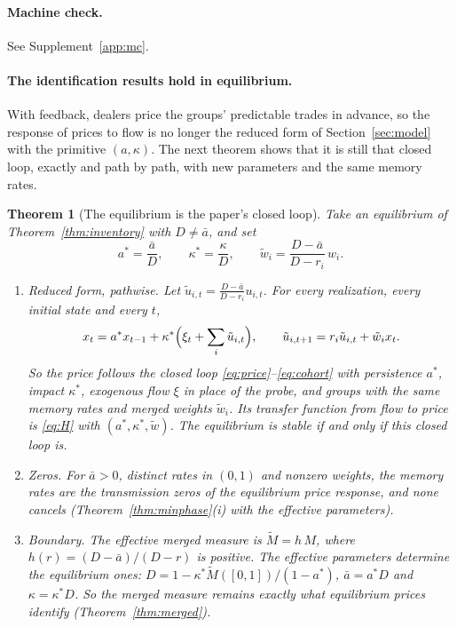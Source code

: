 \documentclass[12pt]{article}
\newtheorem{theorem}{Theorem}[section]
\theoremstyle{definition}
\theoremstyle{remark}
\begin{document}
\paragraph{Machine check.} See Supplement~\ref{app:mc}.

\paragraph{The identification results hold in equilibrium.} With feedback, dealers price the groups' predictable trades in advance, so the response of prices to flow is no longer the reduced form of Section~\ref{sec:model} with the primitive $(a,\kappa)$. The next theorem shows that it is still that closed loop, exactly and path by path, with new parameters and the same memory rates.

\begin{theorem}[The equilibrium is the paper's closed loop]\label{thm:eqreduced}
Take an equilibrium of Theorem~\ref{thm:inventory} with $D\ne\bar a$, and set
\[
 a^*=\frac{\bar a}{D},\qquad \kappa^*=\frac{\kappa}{D},\qquad \tilde w_i=\frac{D-\bar a}{D-r_i}\,w_i .
\]
\begin{enumerate}[label=(\roman*),itemsep=1pt]
\item \emph{Reduced form, pathwise.} Let $\tilde u_{i,t}=\frac{D-\bar a}{D-r_i}u_{i,t}$. For every realization, every initial state and every $t$,
\[
 x_t=a^*x_{t-1}+\kappa^*\Bigl(\xi_t+\sum_i\tilde u_{i,t}\Bigr),\qquad \tilde u_{i,t+1}=r_i\tilde u_{i,t}+\tilde w_ix_t .
\]
So the price follows the closed loop \eqref{eq:price}--\eqref{eq:cohort} with persistence $a^*$, impact $\kappa^*$, exogenous flow $\xi$ in place of the probe, and groups with the same memory rates and merged weights $\tilde w_i$. Its transfer function from flow to price is \eqref{eq:H} with $(a^*,\kappa^*,\tilde w)$. The equilibrium is stable if and only if this closed loop is.
\item \emph{Zeros.} For $\bar a>0$, distinct rates in $(0,1)$ and nonzero weights, the memory rates are the transmission zeros of the equilibrium price response, and none cancels (Theorem~\ref{thm:minphase}(i) with the effective parameters).
\item \emph{Boundary.} The effective merged measure is $\tilde M=h\,M$, where $h(r)=(D-\bar a)/(D-r)$ is positive. The effective parameters determine the equilibrium ones: $D=1-\kappa^*\tilde M([0,1])/(1-a^*)$, $\bar a=a^*D$ and $\kappa=\kappa^*D$. So the merged measure remains exactly what equilibrium prices identify (Theorem~\ref{thm:merged}).

\end{enumerate}
\end{theorem}
\end{document}
